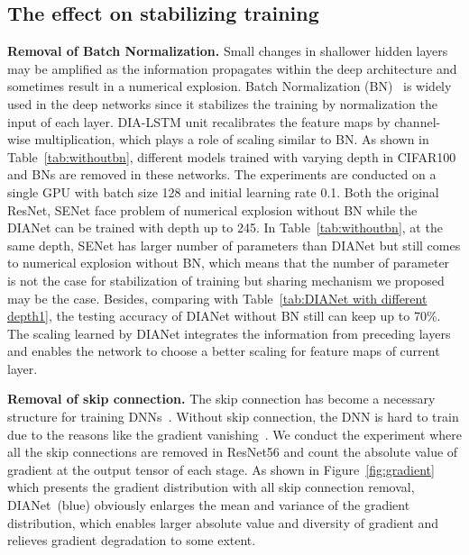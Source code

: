 \documentclass[letterpaper]{article} \usepackage{aaai20}  \usepackage{times}  \usepackage{helvet} \usepackage{courier}  \usepackage[hyphens]{url}  \usepackage{graphicx} \urlstyle{rm} \def\UrlFont{\rm}  \usepackage{graphicx}  \frenchspacing  \setlength{\pdfpagewidth}{8.5in}  \setlength{\pdfpageheight}{11in}  \usepackage{color}
\begin{document}
	\subsection{The effect on stabilizing training}
	\noindent\textbf{Removal of Batch Normalization.} Small changes in shallower hidden layers may be amplified as the information propagates within the deep architecture and sometimes result in a numerical explosion. Batch Normalization (BN)~\cite{Ioffe:2015:BNA:3045118.3045167} is widely used in the deep networks since it stabilizes the training by normalization the input of each layer. DIA-LSTM unit recalibrates the feature maps by channel-wise multiplication, which plays a role of scaling similar to BN. As shown in Table~\ref{tab:withoutbn}, different models trained with varying depth in CIFAR100 and BNs are removed in these networks. The experiments are conducted on a single GPU with batch size 128 and initial learning rate 0.1. Both the original ResNet, SENet face problem of numerical explosion without BN while the DIANet can be trained with depth up to 245. In Table~\ref{tab:withoutbn}, at the same depth, SENet has larger number of parameters than DIANet but still comes to numerical explosion without BN, which means that the number of parameter is not the case for stabilization of training but sharing mechanism we proposed may be the case. Besides, comparing with Table~\ref{tab:DIANet with different depth1}, the testing accuracy of DIANet without BN still can keep up to 70\%. The scaling learned by DIANet integrates the information from preceding layers and enables the network to choose a better scaling for feature maps of current layer. 
	
	\noindent\textbf{Removal of skip connection.} The skip connection has become a necessary structure for training DNNs~\cite{he2016identity}. Without skip connection, the DNN is hard to train due to the reasons like the gradient vanishing~\cite{bengio1994learning,glorot2010understanding,srivastava2015training}. We conduct the experiment where all the skip connections are removed in ResNet56 and count the absolute value of gradient at the output tensor of each stage. As shown in Figure~\ref{fig:gradient} which presents the gradient distribution with all skip connection removal, DIANet~(blue) obviously enlarges the mean and variance of the gradient distribution, which enables larger absolute value and diversity of gradient and relieves gradient degradation to some extent.
\end{document}

